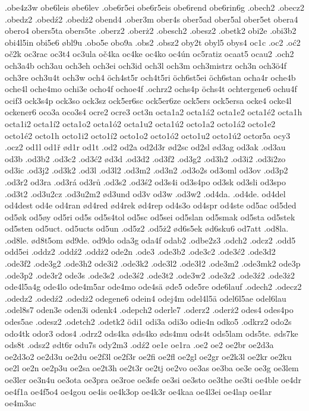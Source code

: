 {{.obe4z3w
obe6leis
øbe6lev
.obe6r5ei
obe6r5eis
obe6rend
obe6rin6g
.obech2
.obecz2
.obedz2
.obedź2
.obedż2
obend4
.ober3m
ober4s
ober5ad
ober5al
ober5et
obera4
obero4
obers5ta
obers5te
.oberz2
.oberż2
.obesch2
.obesz2
.obetk2
obi2e
.obi3b2
obi4l5in
obi5e6
øbl9u
.obo5e
obo9a
.obs2
.obsz2
oby2t
obyl5
obys4
oc1c
.oc2
.oć2
oč2k
oc3rac
oc3t4
oc3ula
oč4ka
oc4ke
oc4ko
oc4ún
oc5ratiz
ocaat5
ocau2
.och2
och3a4b
och3au
och3eh
och3ei
och3id
och3l
och3m
och3mistrz
och3n
och3ö4f
och3re
och3u4t
och3w
och4
öch4st5r
och4t5ri
öch6st5ei
öch6stan
ocha4r
oche4b
oche4l
oche4mo
ochi3e
ocho4f
ochoe4f
.ochrz2
ochs4p
öchs4t
ochtergene6
ochu4f
ocif3
ock3s4p
ock3so
ock3sz
ock5er6sc
ock5er6ze
ock5ers
ock5ersa
ocke4
ocke4l
ockener6
oco3a
oco3s4
ocre2
ocre3
oct3n
octa1a2
octa1á2
octa1e2
octa1é2
octa1h
octa1i2
octa1í2
octa1o2
octa1ó2
octa1u2
octa1ú2
octo1a2
octo1á2
octo1e2
octo1é2
octo1h
octo1i2
octo1í2
octo1o2
octo1ó2
octo1u2
octo1ú2
octor5a
ocy3
.ocz2
od1l
od1ř
ød1r
od1t
.od2
od2a
od2d3r
ød2sc
od2sl
ød3ag
od3ak
.od3au
od3b
.od3b2
.od3c2
.od3ć2
ød3d
.od3d2
.od3f2
.od3g2
.od3h2
.od3i2
.od3i2zo
od3ic
.od3j2
.od3k2
.od3l
.od3l2
.od3m2
.od3n2
.od3o2s
od3oml
od3ov
.od3p2
.od3r2
od3ra
.od3rá
od3rů
.od3s2
.od3ś2
od3s4i
od3s4po
od3sk
od3sli
od3spo
.od3t2
.od3u2cz
.od3u2m2
ød3und
od3v
od3w
.od3w2
.od4da.
.od4de.
od4del
od4dest
od4e
od4ran
ød4red
ød4rek
ød4rep
od4s3o
od4spr
od4ste
od5ac
od5ded
od5øk
od5øy
od5ri
od5s
od5s4tol
od5sc
od5sei
od5slan
od5smak
od5sta
od5stek
od5sten
od5uct.
od5ucts
od5un
.od5z2
.od5ż2
ød6s5ek
ød6sku6
od7att
.od8la.
.od8le.
ød8t5om
ød9de.
od9do
oda3g
oda4f
odab2
.odbe2z3
.odch2
.odcz2
.odd5
odd5ei
.oddz2
.oddź2
.oddż2
ode2n
.ode3
.ode3b2
.ode3c2
.ode3ć2
.ode3d2
.ode3f2
.ode3g2
.ode3h2
ode3i2
.ode3k2
.ode3l2
.ode3ł2
.ode3m2
.ode3mk2
ode3p
.ode3p2
.ode3r2
ode3s
.ode3s2
.ode3ś2
.ode3t2
.ode3w2
.ode3z2
.ode3ź2
.ode3ż2
ode4l5a4g
ode4lo
ode4m5ar
ode4mo
ode4sä
øde5
ode5re
ode6lauf
.odech2
.odecz2
.odedz2
.odedź2
.odedż2
odegene6
odein4
odej4m
odel4l5ä
odel6l5ae
odel6lau
.odel8s7
oden3e
oden3i
odenk4
.odepch2
oderle7
.oderz2
.oderż2
odes4
odes4po
odes5ae
.odesz2
.odetch2
.odetk2
ödi1
odi3a
odi3o
odie4n
odko5
.odkrz2
odo2s
odo4tk
odor3
odos4
.odrz2
ods4ka
øds4ko
øds4mu
ods4t
ods5lam
ods5te.
øds7ke
ods8t
.odsz2
ødt6r
odu7s
ody2m3
.odź2
oe1e
oe1ra
.oe2
oe2
oe2br
oe2d3a
oe2d3o2
oe2d3u
oe2du
oe2f3l
oe2f3r
oe2fi
oe2fl
oe2gl
oe2gr
oe2k3l
oe2kr
oe2ku
oe2l
oe2n
oe2p3u
oe2sa
oe2t3h
oe2t3r
oe2tj
oe2vo
oe3as
oe3ba
oe3e
oe3g
oe3lem
oe3ler
oe3n4u
oe3ota
oe3pra
oe3roe
oe3sfe
oe3si
oe3sto
oe3the
oe3ti
oe4ble
oe4dr
oe4f1a
oe4f5o4
oe4gou
oe4is
oe4k3op
oe4k3r
oe4kaa
oe4l3ei
oe4lap
oe4lar
oe4m3ac
}}
